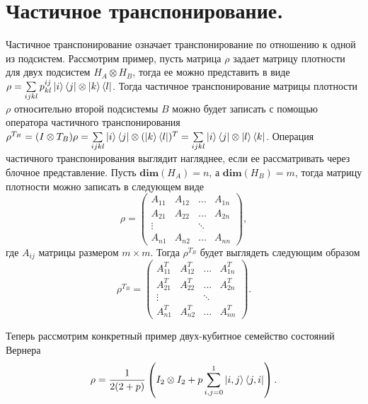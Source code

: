 \section{Частичное транспонирование.}
\label{appendix:partial_transpose}
Частичное транспонирование означает транспонирование по отношению к одной из подсистем. Рассмотрим пример, пусть матрица $\rho$ задает матрицу плотности для двух подсистем $H_A \otimes H_B$, тогда ее можно представить в виде $\rho = \sum\limits_{ijkl} p_{kl}^{ij} \ket{i}\bra{j} \otimes \ket{k} \bra{l}$. Тогда частичное транспонирование матрицы плотности $\rho$ относительно второй подсистемы $B$ можно будет записать с помощью оператора частичного транспонирования $\rho^{T_B} = (I \otimes T_B) \rho = \sum\limits_{ijkl} \ket{i}\bra{j} \otimes (\ket{k} \bra{l})^{T} =  \sum\limits_{ijkl} \ket{i}\bra{j} \otimes \ket{l} \bra{k}$. Операция частичного транспонирования выглядит нагляднее, если ее рассматривать через блочное представление. Пусть $\textbf{dim}(H_A) = n$, а $\textbf{dim}(H_B) = m$, тогда матрицу плотности можно записать в следующем виде
\begin{equation}
    \rho =
    \begin{pmatrix}
        A_{11} & A_{12} & ... & A_{1n} \\
        A_{21} & A_{22} & ... & A_{2n} \\
        \vdots &        & \ddots &     \\
        A_{n1} & A_{n2} & ... & A_{nn}
    \end{pmatrix},
\end{equation}
где $A_{ij}$ матрицы размером $m \times m$. Тогда $\rho^{T_B}$ будет выглядеть следующим образом
\begin{equation}
    \rho^{T_B} =
    \begin{pmatrix}
        A_{11}^T & A_{12}^T & ... & A_{1n}^T \\
        A_{21}^T & A_{22}^T & ... & A_{2n}^T \\
        \vdots &        & \ddots &     \\
        A_{n1}^T & A_{n2}^T & ... & A_{nn}^T
    \end{pmatrix}.
\end{equation}

Теперь рассмотрим конкретный пример двух-кубитное семейство состояний Вернера
\begin{equation}\label{2-qubit-warner-state}
\rho = \frac{1}{2(2 + p)} \left(
I_2 \otimes I_2 + p \sum\limits_{i,j = 0}^{1}\ket{i, j} \bra{j, i}
\right).
\end{equation}

